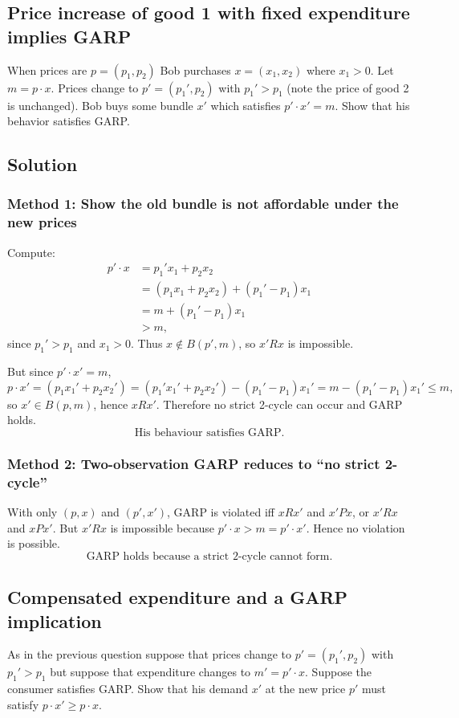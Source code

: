 \documentclass[12pt]{article}
\newcommand{\dotp}{\cdot}
\begin{document}
\subsection{Price increase of good 1 with fixed expenditure implies GARP}
When prices are \(p=(p_1,p_2)\) Bob purchases \(x=(x_1,x_2)\) where \(x_1>0\).
Let \(m=p\dotp x\). Prices change to \(p'=(p_1',p_2)\) with \(p_1'>p_1\) (note the price of good 2 is unchanged).
Bob buys some bundle \(x'\) which satisfies \(p'\dotp x'=m\).
Show that his behavior satisfies GARP.

\subsection*{Solution}
\subsubsection*{Method 1: Show the old bundle is not affordable under the new prices}
Compute:
\begin{align*}
p'\dotp x
&=p_1' x_1+p_2 x_2\\
&=(p_1 x_1+p_2 x_2)+(p_1'-p_1)x_1\\
&=m+(p_1'-p_1)x_1\\
&>m,
\end{align*}
since \(p_1'>p_1\) and \(x_1>0\). Thus \(x\notin B(p',m)\), so \(x'R x\) is impossible.

But since \(p'\dotp x'=m\),
\[
p\dotp x'
=(p_1 x_1'+p_2 x_2')
=(p_1' x_1'+p_2 x_2')-(p_1'-p_1)x_1'
=m-(p_1'-p_1)x_1'\le m,
\]
so \(x'\in B(p,m)\), hence \(xR x'\). Therefore no strict 2-cycle can occur and GARP holds.
\[
\boxed{\text{His behaviour satisfies GARP.}}
\]

\subsubsection*{Method 2: Two-observation GARP reduces to ``no strict 2-cycle''}
With only \((p,x)\) and \((p',x')\), GARP is violated iff \(xR x'\) and \(x'P x\), or \(x'R x\) and \(xP x'\).
But \(x'R x\) is impossible because \(p'\dotp x>m=p'\dotp x'\). Hence no violation is possible.
\[
\boxed{\text{GARP holds because a strict 2-cycle cannot form.}}
\]

\newpage
\subsection{Compensated expenditure and a GARP implication}
As in the previous question suppose that prices change to \(p'=(p_1',p_2)\) with \(p_1'>p_1\)
but suppose that expenditure changes to \(m'=p'\dotp x\).
Suppose the consumer satisfies GARP.
Show that his demand \(x'\) at the new price \(p'\) must satisfy \(p\dotp x'\ge p\dotp x\).
\end{document}

